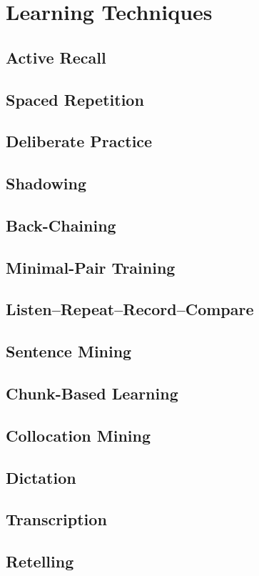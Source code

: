 \chapter{Learning Techniques}

\section{Active Recall}
\section{Spaced Repetition}
\section{Deliberate Practice}
\section{Shadowing}
\section{Back-Chaining}
\section{Minimal-Pair Training}
\section{Listen--Repeat--Record--Compare}
\section{Sentence Mining}
\section{Chunk-Based Learning}
\section{Collocation Mining}
\section{Dictation}
\section{Transcription}
\section{Retelling}
